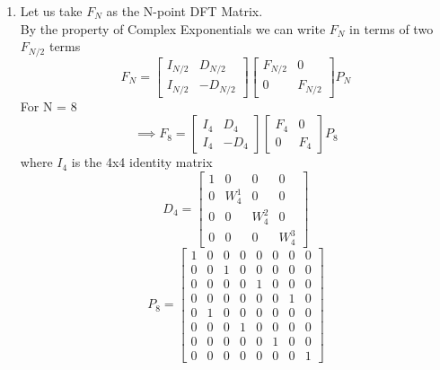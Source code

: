 \documentclass[journal,12pt,twocolumn]{IEEEtran}
\renewcommand\thesection{\arabic{section}}
\begin{document}
\begin{enumerate}[label=\thesection.\arabic*.,ref=\thesection.\theenumi]
\item
Let us take  $F_{N}$ as the N-point DFT Matrix. \\
By the property of Complex Exponentials we can write $F_{N}$ in terms of two $F_{N/2}$ terms\\
\begin{equation}
F_{N}=
\begin{bmatrix}
I_{N/2} & D_{N/2} \\
I_{N/2} & -D_{N/2}
\end{bmatrix}
\begin{bmatrix}
F_{N/2} & 0 \\
0 & F_{N/2}
\end{bmatrix}
P_{N}
\end{equation}
For N = 8
\begin{equation}
\implies F_{8}=
\begin{bmatrix}
I_{4} & D_{4} \\
I_{4} & -D_{4}
\end{bmatrix}
\begin{bmatrix}
F_{4} & 0 \\
0 & F_{4}
\end{bmatrix}
P_{8}
\end{equation}
where
$I_{4}$ is the 4x4 identity matrix
\begin{equation}
D_{4}=
\begin{bmatrix}
1 & 0 & 0 & 0\\
0 & W^{1}_{4} & 0 & 0\\
0 & 0 & W^{2}_{4} & 0\\
0 & 0 & 0 & W^{3}_{4}
\end{bmatrix}
\end{equation}
\begin{equation}
P_{8} =
\begin{bmatrix}
1 & 0 & 0 & 0 & 0 & 0 & 0 & 0\\
0 & 0 & 1 & 0 & 0 & 0 & 0 & 0\\
0 & 0 & 0 & 0 & 1 & 0 & 0 & 0\\
0 & 0 & 0 & 0 & 0 & 0 & 1 & 0\\
0 & 1 & 0 & 0 & 0 & 0 & 0 & 0\\
0 & 0 & 0 & 1 & 0 & 0 & 0 & 0\\
0 & 0 & 0 & 0 & 0 & 1 & 0 & 0\\
0 & 0 & 0 & 0 & 0 & 0 & 0 & 1
\end{bmatrix} 
\end{equation}\\


\end{enumerate}
\end{document}
